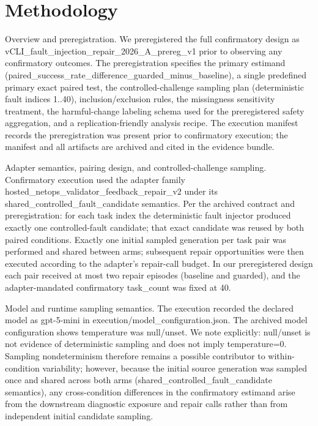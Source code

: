 \documentclass[conference]{IEEEtran}
\begin{document}
\section{Methodology}
Overview and preregistration. We preregistered the full confirmatory design as vCLI\_fault\_injection\_repair\_2026\_A\_prereg\_v1 prior to observing any confirmatory outcomes. The preregistration specifies the primary estimand (paired\_success\_rate\_difference\_guarded\_minus\_baseline), a single predefined primary exact paired test, the controlled-challenge sampling plan (deterministic fault indices 1..40), inclusion/exclusion rules, the missingness sensitivity treatment, the harmful-change labeling schema used for the preregistered safety aggregation, and a replication-friendly analysis recipe. The execution manifest records the preregistration was present prior to confirmatory execution; the manifest and all artifacts are archived and cited in the evidence bundle.

Adapter semantics, pairing design, and controlled-challenge sampling. Confirmatory execution used the adapter family hosted\_netops\_validator\_feedback\_repair\_v2 under its shared\_controlled\_fault\_candidate semantics. Per the archived contract and preregistration: for each task index the deterministic fault injector produced exactly one controlled-fault candidate; that exact candidate was reused by both paired conditions. Exactly one initial sampled generation per task pair was performed and shared between arms; subsequent repair opportunities were then executed according to the adapter's repair-call budget. In our preregistered design each pair received at most two repair episodes (baseline and guarded), and the adapter-mandated confirmatory task\_count was fixed at 40.

Model and runtime sampling semantics. The execution recorded the declared model as gpt-5-mini in execution/model\_configuration.json. The archived model configuration shows temperature was null/unset. We note explicitly: null/unset is not evidence of deterministic sampling and does not imply temperature=0. Sampling nondeterminism therefore remains a possible contributor to within-condition variability; however, because the initial source generation was sampled once and shared across both arms (shared\_controlled\_fault\_candidate semantics), any cross-condition differences in the confirmatory estimand arise from the downstream diagnostic exposure and repair calls rather than from independent initial candidate sampling.
\end{document}
